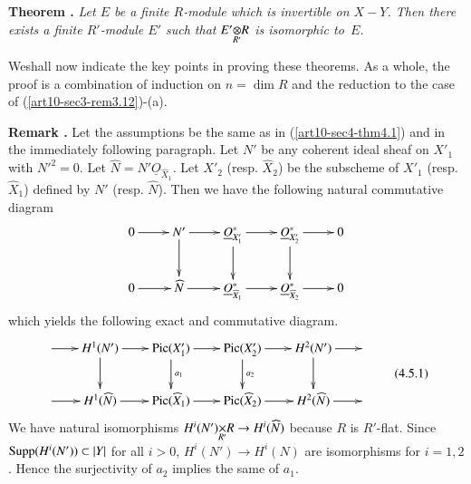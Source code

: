 \medskip
\noindent
{\bf Theorem .\label{art10-sec4-thm4.4}}
{\em Let $E$ be a finite $R$-module which is invertible on $X-Y$. Then there exists a finite $R'$-module $E'$ such that $\foprod{E'}{R}{R'}$ is isomorphic to~$E$.}
\smallskip

We\pageoriginale shall now indicate the key points in proving these theorems. As a whole, the proof is a combination of induction on $n=\dim R$ and the reduction to the case of (\ref{art10-sec3-rem3.12})-(a).

\medskip
\noindent
{\bf Remark .\label{art10-sec4-rem4.5}}
Let the assumptions be the same as in (\ref{art10-sec4-thm4.1}) and in the immediately following paragraph. Let $N'$ be any coherent ideal sheaf on $X'_{1}$ with ${N'}^{2}=0$. Let $\widehat{N}=N'\underline{O}_{\widehat{X}_{1}}$. Let $X'_{2}$ (resp. $\widehat{X}_{2}$) be the subscheme of $X'_{1}$ (resp. $\widehat{X}_{1}$) defined by $N'$ (resp. $\widehat{N}$). Then we have the following natural commutative diagram
\[
\xymatrix{
0\ar[r] & N'\ar[d] \ar[r] & \underline{O}^{*}_{X'_{1}}\ar[d] \ar[r] & \underline{O}^{*}_{X'_{2}}\ar[d]\ar[r] & 0\\
0\ar[r] & \widehat{N}\ar[r] & \underline{O}^{*}_{\widehat{X}_{1}}\ar[r] & \underline{O}^{*}_{\widehat{X}_{2}}\ar[r] & 0
}
\]
which yields the following exact and commutative diagram.
\begin{equation*}
\vcenter{\xymatrix@C=.72cm{
\ar[r] & H^{1}(N')\ar[d]\ar[r] & \Pic(X'_{1})\ar[d]^-{a_{1}}\ar[r] & \Pic(X'_{2})\ar[d]^-{a_{2}}\ar[r] & H^{2}(N')\ar[d]\ar[r] &\\
\ar[r] & H^{1}(\widehat{N})\ar[r] & \Pic(\widehat{X}_{1})\ar[r] & \Pic(\widehat{X}_{2})\ar[r] & H^{2}(\widehat{N})\ar[r] & 
}}\tag{4.5.1}\label{art10-sec4-eq4.5.1}
\end{equation*}
We have natural isomorphisms $\fprod{H^{i}(N')}{R}{R'}\to H^{i}(\widehat{N})$ because $R$ is $R'$-flat. Since $\operatorname{\mathrm{Supp}} (H^{i}(N'))\subset |Y|$ for all $i>0$, $H^{i}(N')\to H^{i}(N)$ are isomorphisms for $i=1,2$. Hence the surjectivity of $a_{2}$ implies the same of $a_{1}$.

